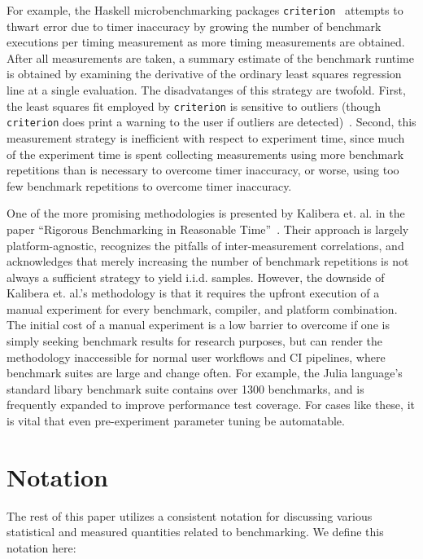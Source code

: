 \documentclass[conference]{IEEEtran}
\begin{document}
For example, the Haskell microbenchmarking packages \lstinline|criterion|~\cite{criterion}
attempts to thwart error due to timer inaccuracy by growing the number of benchmark
executions per timing measurement as more timing measurements are obtained. After all
measurements are taken, a summary estimate of the benchmark runtime is obtained by examining
the derivative of the ordinary least squares regression line at a single evaluation. The
disadvatanges of this strategy are twofold. First, the least squares fit employed by
\lstinline|criterion| is sensitive to outliers (though \lstinline|criterion| does print a
warning to the user if outliers are detected)~\cite{Maronna2006}. Second, this measurement
strategy is inefficient with respect to experiment time, since much of the experiment time
is spent collecting measurements using more benchmark repetitions than is necessary to
overcome timer inaccuracy, or worse, using too few benchmark repetitions to overcome timer
inaccuracy.

One of the more promising methodologies is presented by Kalibera et. al. in the paper
``Rigorous Benchmarking in Reasonable Time''~\cite{Kalibera2013}. Their approach is largely
platform-agnostic, recognizes the pitfalls of inter-measurement correlations, and
acknowledges that merely increasing the number of benchmark repetitions is not always a
sufficient strategy to yield i.i.d. samples. However, the downside of Kalibera et. al.'s
methodology is that it requires the upfront execution of a manual experiment for every
benchmark, compiler, and platform combination. The initial cost of a manual experiment is a
low barrier to overcome if one is simply seeking benchmark results for research purposes,
but can render the methodology inaccessible for normal user workflows and CI pipelines,
where benchmark suites are large and change often. For example, the Julia language's
standard libary benchmark suite contains over 1300 benchmarks, and is frequently expanded
to improve performance test coverage. For cases like these, it is vital that even
pre-experiment parameter tuning be automatable.

\label{sec:notation}
\section{Notation}

The rest of this paper utilizes a consistent notation for discussing various statistical and
measured quantities related to benchmarking. We define this notation here:
\end{document}
